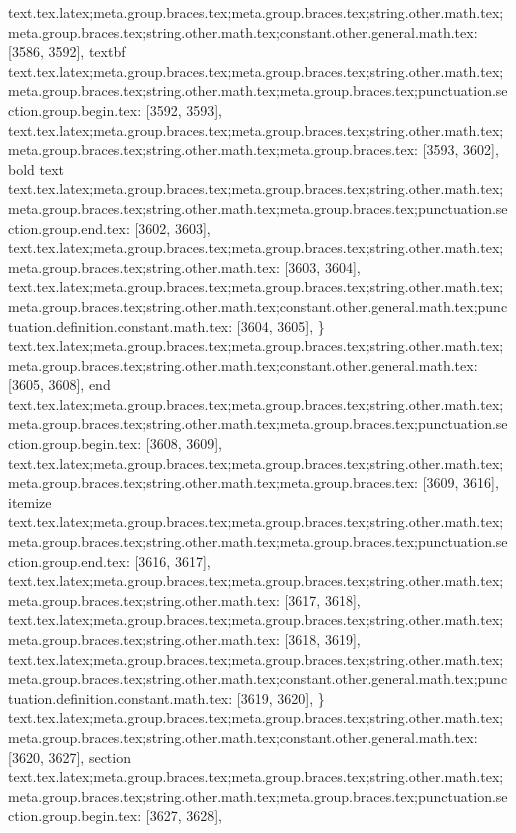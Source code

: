 {{{{{{{{{{{{{{{{{{{{{{{{{{{{{{{{{{{{{{{{{{{{{{{{{{{{{{{{{{{{{{{{{{{{{{{{{{{{{{{{{{{{{{{{{{{{{{{{{{{{{{{{{{{{{{{text.tex.latex;meta.group.braces.tex;meta.group.braces.tex;string.other.math.tex;meta.group.braces.tex;string.other.math.tex;constant.other.general.math.tex: [3586, 3592], {textbf}
text.tex.latex;meta.group.braces.tex;meta.group.braces.tex;string.other.math.tex;meta.group.braces.tex;string.other.math.tex;meta.group.braces.tex;punctuation.section.group.begin.tex: [3592, 3593], {{}
text.tex.latex;meta.group.braces.tex;meta.group.braces.tex;string.other.math.tex;meta.group.braces.tex;string.other.math.tex;meta.group.braces.tex: [3593, 3602], {bold text}
text.tex.latex;meta.group.braces.tex;meta.group.braces.tex;string.other.math.tex;meta.group.braces.tex;string.other.math.tex;meta.group.braces.tex;punctuation.section.group.end.tex: [3602, 3603], {}}
text.tex.latex;meta.group.braces.tex;meta.group.braces.tex;string.other.math.tex;meta.group.braces.tex;string.other.math.tex: [3603, 3604], {
}
text.tex.latex;meta.group.braces.tex;meta.group.braces.tex;string.other.math.tex;meta.group.braces.tex;string.other.math.tex;constant.other.general.math.tex;punctuation.definition.constant.math.tex: [3604, 3605], {\}
text.tex.latex;meta.group.braces.tex;meta.group.braces.tex;string.other.math.tex;meta.group.braces.tex;string.other.math.tex;constant.other.general.math.tex: [3605, 3608], {end}
text.tex.latex;meta.group.braces.tex;meta.group.braces.tex;string.other.math.tex;meta.group.braces.tex;string.other.math.tex;meta.group.braces.tex;punctuation.section.group.begin.tex: [3608, 3609], {{}
text.tex.latex;meta.group.braces.tex;meta.group.braces.tex;string.other.math.tex;meta.group.braces.tex;string.other.math.tex;meta.group.braces.tex: [3609, 3616], {itemize}
text.tex.latex;meta.group.braces.tex;meta.group.braces.tex;string.other.math.tex;meta.group.braces.tex;string.other.math.tex;meta.group.braces.tex;punctuation.section.group.end.tex: [3616, 3617], {}}
text.tex.latex;meta.group.braces.tex;meta.group.braces.tex;string.other.math.tex;meta.group.braces.tex;string.other.math.tex: [3617, 3618], {
}
text.tex.latex;meta.group.braces.tex;meta.group.braces.tex;string.other.math.tex;meta.group.braces.tex;string.other.math.tex: [3618, 3619], {
}
text.tex.latex;meta.group.braces.tex;meta.group.braces.tex;string.other.math.tex;meta.group.braces.tex;string.other.math.tex;constant.other.general.math.tex;punctuation.definition.constant.math.tex: [3619, 3620], {\}
text.tex.latex;meta.group.braces.tex;meta.group.braces.tex;string.other.math.tex;meta.group.braces.tex;string.other.math.tex;constant.other.general.math.tex: [3620, 3627], {section}
text.tex.latex;meta.group.braces.tex;meta.group.braces.tex;string.other.math.tex;meta.group.braces.tex;string.other.math.tex;meta.group.braces.tex;punctuation.section.group.begin.tex: [3627, 3628], {{}
}}}}}}}}}}}}}}}}}}}}}}}}}}}}}}}}}}}}}}}}}}}}}}}}}}}}}}}}}}}}}}}}}}}}}}}}}}}}}}}}}}}}}}}}}}}}}}}}}}}}}}}}}}}}}}}}}}
